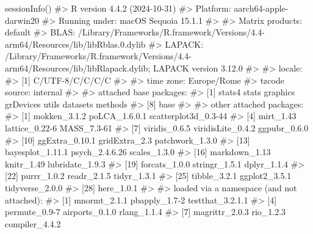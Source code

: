 \documentclass[
  letterpaper,
  DIV=11,
  numbers=noendperiod]{scrreprt}
\newenvironment{Shaded}{\begin{snugshade}}{\end{snugshade}}
\newcommand{\CommentTok}[1]{\textcolor[rgb]{0.37,0.37,0.37}{#1}}
\newcommand{\FunctionTok}[1]{\textcolor[rgb]{0.28,0.35,0.67}{#1}}
\newcommand{\NormalTok}[1]{\textcolor[rgb]{0.00,0.23,0.31}{#1}}
\theoremstyle{definition}
\theoremstyle{remark}
\begin{document}
\begin{Shaded}
\begin{Highlighting}[]
\FunctionTok{sessionInfo}\NormalTok{()}
\CommentTok{\#\textgreater{} R version 4.4.2 (2024{-}10{-}31)}
\CommentTok{\#\textgreater{} Platform: aarch64{-}apple{-}darwin20}
\CommentTok{\#\textgreater{} Running under: macOS Sequoia 15.1.1}
\CommentTok{\#\textgreater{} }
\CommentTok{\#\textgreater{} Matrix products: default}
\CommentTok{\#\textgreater{} BLAS:   /Library/Frameworks/R.framework/Versions/4.4{-}arm64/Resources/lib/libRblas.0.dylib }
\CommentTok{\#\textgreater{} LAPACK: /Library/Frameworks/R.framework/Versions/4.4{-}arm64/Resources/lib/libRlapack.dylib;  LAPACK version 3.12.0}
\CommentTok{\#\textgreater{} }
\CommentTok{\#\textgreater{} locale:}
\CommentTok{\#\textgreater{} [1] C/UTF{-}8/C/C/C/C}
\CommentTok{\#\textgreater{} }
\CommentTok{\#\textgreater{} time zone: Europe/Rome}
\CommentTok{\#\textgreater{} tzcode source: internal}
\CommentTok{\#\textgreater{} }
\CommentTok{\#\textgreater{} attached base packages:}
\CommentTok{\#\textgreater{} [1] stats4    stats     graphics  grDevices utils     datasets  methods  }
\CommentTok{\#\textgreater{} [8] base     }
\CommentTok{\#\textgreater{} }
\CommentTok{\#\textgreater{} other attached packages:}
\CommentTok{\#\textgreater{}  [1] mokken\_3.1.2         poLCA\_1.6.0.1        scatterplot3d\_0.3{-}44}
\CommentTok{\#\textgreater{}  [4] mirt\_1.43            lattice\_0.22{-}6       MASS\_7.3{-}61         }
\CommentTok{\#\textgreater{}  [7] viridis\_0.6.5        viridisLite\_0.4.2    ggpubr\_0.6.0        }
\CommentTok{\#\textgreater{} [10] ggExtra\_0.10.1       gridExtra\_2.3        patchwork\_1.3.0     }
\CommentTok{\#\textgreater{} [13] bayesplot\_1.11.1     psych\_2.4.6.26       scales\_1.3.0        }
\CommentTok{\#\textgreater{} [16] markdown\_1.13        knitr\_1.49           lubridate\_1.9.3     }
\CommentTok{\#\textgreater{} [19] forcats\_1.0.0        stringr\_1.5.1        dplyr\_1.1.4         }
\CommentTok{\#\textgreater{} [22] purrr\_1.0.2          readr\_2.1.5          tidyr\_1.3.1         }
\CommentTok{\#\textgreater{} [25] tibble\_3.2.1         ggplot2\_3.5.1        tidyverse\_2.0.0     }
\CommentTok{\#\textgreater{} [28] here\_1.0.1          }
\CommentTok{\#\textgreater{} }
\CommentTok{\#\textgreater{} loaded via a namespace (and not attached):}
\CommentTok{\#\textgreater{}  [1] mnormt\_2.1.1         pbapply\_1.7{-}2        testthat\_3.2.1.1    }
\CommentTok{\#\textgreater{}  [4] permute\_0.9{-}7        airports\_0.1.0       rlang\_1.1.4         }
\CommentTok{\#\textgreater{}  [7] magrittr\_2.0.3       rio\_1.2.3            compiler\_4.4.2      }

\end{Highlighting}
\end{Shaded}
\end{document}

